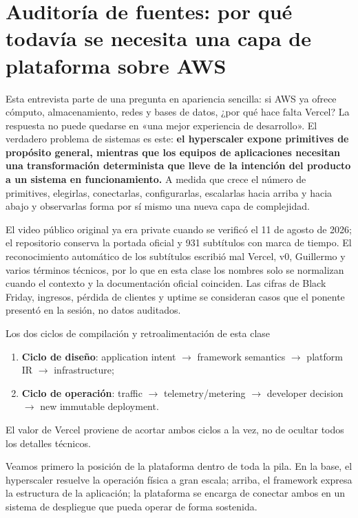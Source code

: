 \documentclass[a4paper]{article}
\begin{document}
\makecscover

\section{Auditoría de fuentes: por qué todavía se necesita una capa de plataforma sobre AWS}

Esta entrevista parte de una pregunta en apariencia sencilla: si AWS ya ofrece cómputo, almacenamiento, redes y bases de datos, ¿por qué hace falta Vercel? La respuesta no puede quedarse en «una mejor experiencia de desarrollo». El verdadero problema de sistemas es este: \textbf{el hyperscaler expone primitives de propósito general, mientras que los equipos de aplicaciones necesitan una transformación determinista que lleve de la intención del producto a un sistema en funcionamiento.} A medida que crece el número de primitives, elegirlas, conectarlas, configurarlas, escalarlas hacia arriba y hacia abajo y observarlas forma por sí mismo una nueva capa de complejidad.

El video público original ya era private cuando se verificó el 11 de agosto de 2026; el repositorio conserva la portada oficial y 931 subtítulos con marca de tiempo. El reconocimiento automático de los subtítulos escribió mal Vercel, v0, Guillermo y varios términos técnicos, por lo que en esta clase los nombres solo se normalizan cuando el contexto y la documentación oficial coinciden. Las cifras de Black Friday, ingresos, pérdida de clientes y uptime se consideran casos que el ponente presentó en la sesión, no datos auditados.

\begin{importantbox}{Los dos ciclos de compilación y retroalimentación de esta clase}
\begin{enumerate}
  \item \textbf{Ciclo de diseño}: application intent $\rightarrow$ framework semantics $\rightarrow$ platform IR $\rightarrow$ infrastructure;
  \item \textbf{Ciclo de operación}: traffic $\rightarrow$ telemetry/metering $\rightarrow$ developer decision $\rightarrow$ new immutable deployment.
\end{enumerate}
El valor de Vercel proviene de acortar ambos ciclos a la vez, no de ocultar todos los detalles técnicos.
\end{importantbox}

Veamos primero la posición de la plataforma dentro de toda la pila. En la base, el hyperscaler resuelve la operación física a gran escala; arriba, el framework expresa la estructura de la aplicación; la plataforma se encarga de conectar ambos en un sistema de despliegue que pueda operar de forma sostenida.
\end{document}
